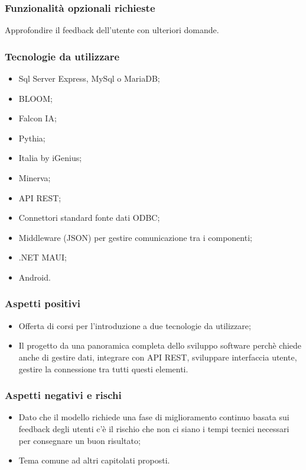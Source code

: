 \documentclass[10pt]{article}
\begin{document}
\subsubsection{Funzionalità opzionali richieste}
Approfondire il feedback dell’utente con ulteriori domande.
\subsubsection{Tecnologie da utilizzare}
\begin{itemize}
    \item Sql Server Express, MySql o MariaDB;
    \item BLOOM;
    \item Falcon IA;
    \item Pythia;
    \item Italia by iGenius;
    \item Minerva;
    \item API REST;
    \item Connettori standard fonte dati ODBC;
    \item Middleware (JSON) per gestire comunicazione tra i componenti;
    \item .NET MAUI;
    \item Android.
\end{itemize}
\subsubsection{Aspetti positivi}
\begin{itemize}
    \item Offerta di corsi per l’introduzione a due tecnologie da utilizzare;
    \item Il progetto da una panoramica completa dello sviluppo software perchè chiede anche di gestire dati, integrare con API REST, sviluppare interfaccia utente, gestire la connessione tra tutti questi elementi.
\end{itemize}
\subsubsection{Aspetti negativi e rischi}
\begin{itemize}
    \item Dato che il modello richiede una fase di miglioramento continuo basata sui feedback degli utenti c’è il rischio che non ci siano i tempi tecnici necessari per consegnare un buon risultato;
    \item Tema comune ad altri capitolati proposti.
\end{itemize}
\end{document}
